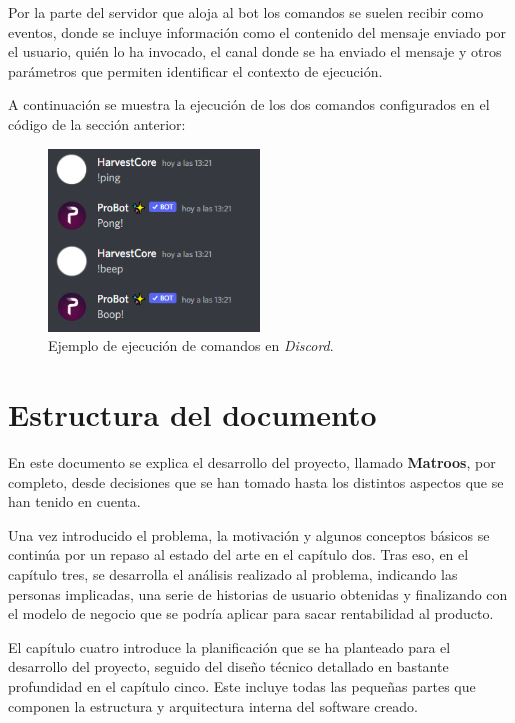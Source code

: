 Por la parte del servidor que aloja al bot los comandos se suelen recibir como eventos, donde se incluye información como el contenido del mensaje enviado por el usuario, quién lo ha invocado, el canal donde se ha enviado el mensaje y otros parámetros que permiten identificar el contexto de ejecución.

A continuación se muestra la ejecución de los dos comandos configurados en el código de la sección anterior:

\begin{figure}[H]
	\centering
	\includegraphics[width=0.5\textwidth]{img/commands.png}
	\caption{Ejemplo de ejecución de comandos en \textit{Discord}.}
\end{figure}



\section{Estructura del documento}

En este documento se explica el desarrollo del proyecto, llamado \textbf{Matroos}, por completo, desde decisiones que se han tomado hasta los distintos aspectos que se han tenido en cuenta.

Una vez introducido el problema, la motivación y algunos conceptos básicos se continúa por un repaso al estado del arte en el capítulo dos. Tras eso, en el capítulo tres, se desarrolla el análisis realizado al problema, indicando las personas implicadas, una serie de historias de usuario obtenidas y finalizando con el modelo de negocio que se podría aplicar para sacar rentabilidad al producto.

El capítulo cuatro introduce la planificación que se ha planteado para el desarrollo del proyecto, seguido del diseño técnico detallado en bastante profundidad en el capítulo cinco. Este incluye todas las pequeñas partes que componen la estructura y arquitectura interna del software creado.

